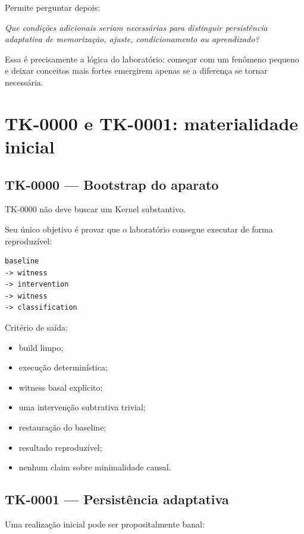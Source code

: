 \documentclass[11pt,a4paper]{article}
\begin{document}
Permite perguntar depois:

\begin{center}
\emph{Que condições adicionais seriam necessárias para distinguir persistência
adaptativa de memorização, ajuste, condicionamento ou aprendizado?}
\end{center}

Essa é precisamente a lógica do laboratório: começar com um fenômeno pequeno e
deixar conceitos mais fortes emergirem apenas se a diferença se tornar necessária.

\section{TK-0000 e TK-0001: materialidade inicial}

\subsection{TK-0000 — Bootstrap do aparato}

TK-0000 não deve buscar um Kernel substantivo.

Seu único objetivo é provar que o laboratório consegue executar de forma
reproduzível:

\begin{lstlisting}
baseline
-> witness
-> intervention
-> witness
-> classification
\end{lstlisting}

Critério de saída:

\begin{itemize}
  \item build limpo;
  \item execução determinística;
  \item witness basal explícito;
  \item uma intervenção subtrativa trivial;
  \item restauração do baseline;
  \item resultado reproduzível;
  \item nenhum claim sobre minimalidade causal.
\end{itemize}

\subsection{TK-0001 — Persistência adaptativa}

Uma realização inicial pode ser propositalmente banal:
\end{document}
